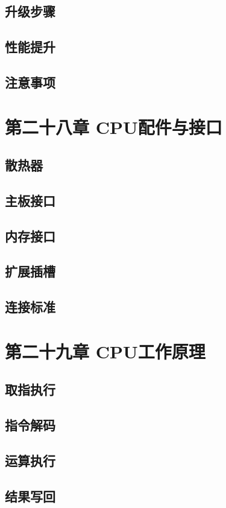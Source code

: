 \documentclass[12pt,UTF8]{ctexbook}
\begin{document}
\section{升级步骤}
\section{性能提升}
\section{注意事项}

\chapter{第二十八章 CPU配件与接口}

\section{散热器}
\section{主板接口}
\section{内存接口}
\section{扩展插槽}
\section{连接标准}

\chapter{第二十九章 CPU工作原理}

\section{取指执行}
\section{指令解码}
\section{运算执行}
\section{结果写回}
\end{document}

